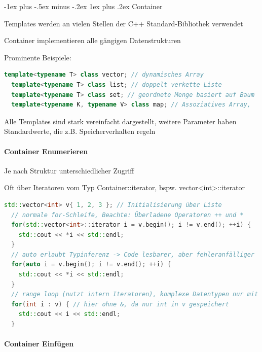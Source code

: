 \documentclass[10pt]{article}
\makeatletter
\renewcommand{\subsubsection}{\@startsection{subsubsection}{3}{0mm}%
                                {-1ex plus -.5ex minus -.2ex}%
                                {1ex plus .2ex}%
                                {\normalfont\small\bfseries}}
\makeatother
\begin{document}
\subsubsection{Container}
\begin{itemize*}
  \item Templates werden an vielen Stellen der C++ Standard-Bibliothek verwendet
  \item Container implementieren alle gängigen Datenstrukturen
  \item Prominente Beispiele:
  \begin{lstlisting}[language=C++]
  template<typename T> class vector; // dynamisches Array
  template<typename T> class list; // doppelt verkette Liste
  template<typename T> class set; // geordnete Menge basiert auf Baum
  template<typename K, typename V> class map; // Assoziatives Array,
  \end{lstlisting}
  \item Alle Templates sind stark vereinfacht dargestellt, weitere Parameter haben Standardwerte, die z.B. Speicherverhalten regeln
\end{itemize*}

\paragraph{Container Enumerieren}

\begin{itemize*}
  \item Je nach Struktur unterschiedlicher Zugriff
  \item Oft über Iteratoren vom Typ Container::iterator, bspw. vector<int>::iterator
\end{itemize*}
\begin{lstlisting}[language=C++]
  std::vector<int> v{ 1, 2, 3 }; // Initialisierung über Liste
  // normale for-Schleife, Beachte: Überladene Operatoren ++ und *
  for(std::vector<int>::iterator i = v.begin(); i != v.end(); ++i) {
    std::cout << *i << std::endl;
  }
  // auto erlaubt Typinferenz -> Code lesbarer, aber fehleranfälliger
  for(auto i = v.begin(); i != v.end(); ++i) {
    std::cout << *i << std::endl;
  }
  // range loop (nutzt intern Iteratoren), komplexe Datentypen nur mit Ref. & sonst werden Kopie erzeugt!
  for(int i : v) { // hier ohne &, da nur int in v gespeichert
    std::cout << i << std::endl;
  }
  \end{lstlisting}

\paragraph{Container Einfügen}
\end{document}

